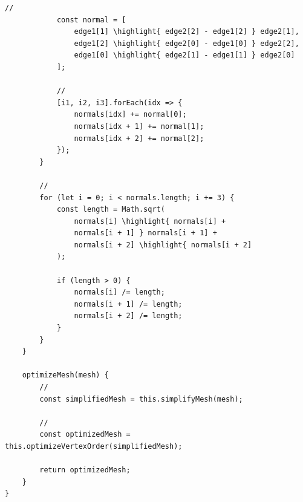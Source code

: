 \begin{lstlisting}[style=javascript]
            // 
            const normal = [
                edge1[1] \highlight{ edge2[2] - edge1[2] } edge2[1],
                edge1[2] \highlight{ edge2[0] - edge1[0] } edge2[2],
                edge1[0] \highlight{ edge2[1] - edge1[1] } edge2[0]
            ];
            
            // 
            [i1, i2, i3].forEach(idx => {
                normals[idx] += normal[0];
                normals[idx + 1] += normal[1];
                normals[idx + 2] += normal[2];
            });
        }
        
        // 
        for (let i = 0; i < normals.length; i += 3) {
            const length = Math.sqrt(
                normals[i] \highlight{ normals[i] +
                normals[i + 1] } normals[i + 1] +
                normals[i + 2] \highlight{ normals[i + 2]
            );
            
            if (length > 0) {
                normals[i] /= length;
                normals[i + 1] /= length;
                normals[i + 2] /= length;
            }
        }
    }
    
    optimizeMesh(mesh) {
        // 
        const simplifiedMesh = this.simplifyMesh(mesh);
        
        // 
        const optimizedMesh = this.optimizeVertexOrder(simplifiedMesh);
        
        return optimizedMesh;
    }
}
\end{lstlisting}

\hypertarget{section-75}{%
\subsubsection{}\label{section-75}}

\hypertarget{section-76}{%
\paragraph{}\label{section-76}}

